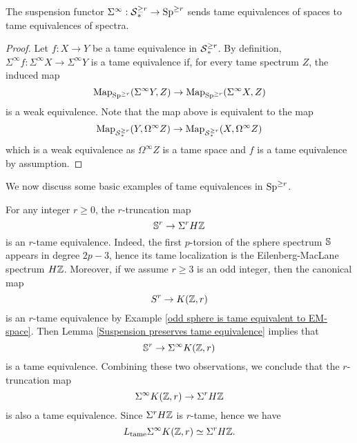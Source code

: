 \begin{lemma}
\label{Suspension preserves tame equivalence}
	The suspension functor $\Sigma^{\infty}:\operatorname{\mathcal{S}}^{\geq r}_{*} \to \operatorname{Sp}^{\geq r}$ sends tame equivalences of spaces to tame equivalences of spectra.
\end{lemma}
\begin{proof}
	Let $f:X\to Y$ be a tame equivalence in $\operatorname{\mathcal{S}}^{\geq r}_{*}$. By definition, $\Sigma^{\infty}f: \Sigma^{\infty}X \to \Sigma^{\infty}Y$ is a tame equivalence if, for every tame spectrum $Z$, the induced map
	$$
	\operatorname{Map}_{\operatorname{Sp}^{\geq r}}(\Sigma^{\infty} Y, Z) \to 	\operatorname{Map}_{\operatorname{Sp}^{\geq r}}(\Sigma^{\infty} X, Z)
	$$
	is a weak equivalence. Note that the map above is equivalent to the map
	$$
	\operatorname{Map}_{\operatorname{\mathcal{S}}^{\geq r}_{*}}(Y, \Omega^{\infty} Z) \to 	\operatorname{Map}_{\operatorname{\mathcal{S}}^{\geq r}_{*}}(X, \Omega^{\infty} Z)
	$$
	which is a weak equivalence as $\Omega^{\infty}Z$ is a tame space and $f$ is a tame equivalence by assumption.
	
\end{proof}





	

We now discuss some basic examples of tame equivalences in $\operatorname{Sp}^{\geq r}$.
\begin{example}
\label{C_tame of suspension of Eilenberg-Maclane space}
For any integer $r\geq 0$, the $r$-truncation map
$$
{\mathbb{S}}^{r} \to \Sigma^r H{\mathbb{Z}}
$$
is an $r$-tame equivalence.
	Indeed, the first $p$-torsion of the sphere spectrum ${\mathbb{S}}$ appears in degree $2p-3$, hence its tame localization is the Eilenberg-MacLane spectrum $H{\mathbb{Z}}$.
	Moreover, if we assume $r\geq 3$ is an odd integer, then the canonical map
	$$
	S^{r} \to K({\mathbb{Z}}, r) 
	$$
	is an $r$-tame equivalence by Example \ref{odd sphere is tame equivalent to EM-space}. Then Lemma \ref{Suspension preserves tame equivalence} implies that 
	$$
	{\mathbb{S}}^{r} \to 
	\Sigma^{\infty}K({\mathbb{Z}}, r) 
	$$
	is a tame equivalence.
	Combining these two observations, we conclude that the $r$-truncation map
	$$
	\Sigma^{\infty}K({\mathbb{Z}}, r) \to
	\Sigma^{r} H{\mathbb{Z}}
	$$
	is also a tame equivalence. Since $\Sigma^{r} H{\mathbb{Z}}$ is $r$-tame, hence we have 
	$$
	L_{\operatorname{\operatorname{tame}}}\Sigma^{\infty}K({\mathbb{Z}}, r)
	\simeq
	\Sigma^{r} H{\mathbb{Z}}.
	$$
\end{example}


